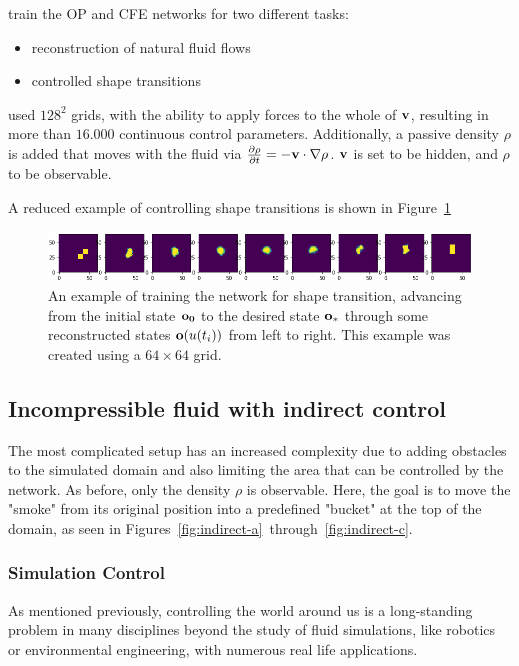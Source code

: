 \documentclass[acmtog]{techreportacmart}
\begin{document}
\cite{ControlPDEs} train the OP and CFE networks for two different tasks:
\begin{itemize}
  \item reconstruction of natural fluid flows
  \item controlled shape transitions
\end{itemize}

\cite{ControlPDEs} used $128^2$ grids, with the ability to apply forces
to the whole of $\vb{v}$, resulting in more than $16.000$ continuous control
parameters. Additionally, a passive density $\rho$ is added that
moves with the fluid via $\pdv{\rho}{t} = -\vb{v} \cdot \nabla \rho$. $\vb{v}$
is set to be hidden, and $\rho$ to be observable. 

A reduced example of controlling shape transitions is shown in
Figure~\ref{fig:shape-transition}

\begin{figure}
  \centering
  \includegraphics[width=1.0\textwidth]{shape-transition.png}
  \caption{
    An example of training the network for shape transition, advancing from the
    initial state $\vb{o_0}$ to the desired state $\vb{o_*}$ through some
    reconstructed states $\vb{o}(u(t_i))$ from left to right. This example was
    created using a $64 \times 64$ grid. 
  }
  \label{fig:shape-transition}
\end{figure}

\subsection{Incompressible fluid with indirect control}
The most complicated setup has an increased complexity due to adding obstacles
to the simulated domain and also limiting the area that can be controlled by the
network. As before, only the density $\rho$ is observable. Here, the goal is to
move the "smoke" from its original position into a predefined "bucket" at the
top of the domain, as seen in
Figures~\ref{fig:indirect-a}~through~\ref{fig:indirect-c}.

\subsubsection{Simulation Control}
As mentioned previously, controlling the world around us is a long-standing
problem in many disciplines beyond the study of fluid simulations, like
robotics or environmental engineering, with numerous real life applications.
\end{document}
